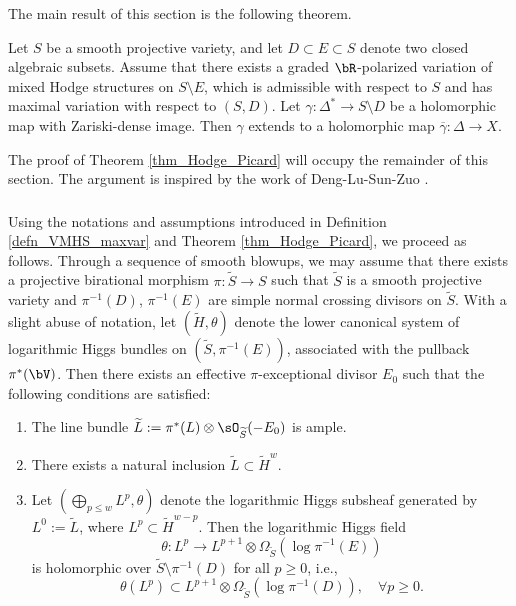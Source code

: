 \documentclass[11pt,letterpaper]{amsart}
\numberwithin{equation}{section}
\begin{document}
	The main result of this section is the following theorem.  
	\begin{thm}\label{thm_Hodge_Picard}  
		Let $S$ be a smooth projective variety, and let $D \subset E \subset S$ denote two closed algebraic subsets. Assume that there exists a graded $\bR$-polarized variation of mixed Hodge structures on $S \setminus E$, which is admissible with respect to $S$ and has maximal variation with respect to $(S, D)$. Let $\gamma: \Delta^\ast \to S \setminus D$ be a holomorphic map with Zariski-dense image. Then $\gamma$ extends to a holomorphic map $\overline{\gamma}: \Delta \to X$.  
	\end{thm}      
	The proof of Theorem \ref{thm_Hodge_Picard} will occupy the remainder of this section. The argument is inspired by the work of Deng-Lu-Sun-Zuo \cite{DLSZ}.
	\subsubsection{}
	Using the notations and assumptions introduced in Definition \ref{defn_VMHS_maxvar} and Theorem \ref{thm_Hodge_Picard}, we proceed as follows. Through a sequence of smooth blowups, we may assume that there exists a projective birational morphism $\pi: \widetilde{S} \to S$ such that $\widetilde{S}$ is a smooth projective variety and $\pi^{-1}(D)$, $\pi^{-1}(E)$ are simple normal crossing divisors on $\widetilde{S}$. With a slight abuse of notation, let $(\widetilde{H}, \theta)$ denote the lower canonical system of logarithmic Higgs bundles on $(\widetilde{S}, \pi^{-1}(E))$, associated with the pullback $\pi^{\ast}(\bV)$.     
	Then there exists an effective $\pi$-exceptional divisor $E_0$ such that the following conditions are satisfied:  
	\begin{enumerate}  
		\item The line bundle $\widetilde{L} := \pi^\ast(L) \otimes \sO_{\widetilde{S}}(-E_0)$ is ample.  
		\item There exists a natural inclusion $\widetilde{L} \subset \widetilde{H}^{w}$.  
		\item Let $(\bigoplus_{p\leq w} L^p, \theta)$ denote the logarithmic Higgs subsheaf generated by $L^0 := \widetilde{L}$, where $L^p \subset \widetilde{H}^{w-p}$. Then the logarithmic Higgs field  
		$$  
		\theta: L^p \to L^{p+1} \otimes \Omega_{\widetilde{S}}(\log \pi^{-1}(E))  
		$$  
		is holomorphic over $\widetilde{S} \setminus \pi^{-1}(D)$ for all $p \geq 0$, i.e.,  
		$$  
		\theta(L^p) \subset L^{p+1} \otimes \Omega_{\widetilde{S}}(\log \pi^{-1}(D)), \quad \forall p \geq 0.  
		$$  
	\end{enumerate}
\end{document}
